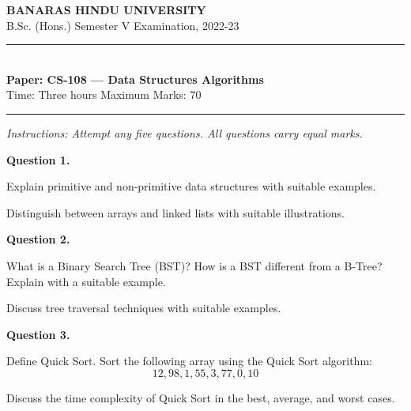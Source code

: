 \documentclass[11pt,a4paper]{article}
\begin{document}
\begin{center}
  {\large\bfseries BANARAS HINDU UNIVERSITY}\\[2pt]
  {\normalsize B.Sc. (Hons.) Semester V Examination, 2022-23}\\[6pt]
  \rule{0.8\linewidth}{0.5pt}\\[6pt]
  {\large\bfseries Paper: CS-108 --- Data Structures Algorithms}\\[4pt]
  {\normalsize Time: Three hours \hfill Maximum Marks: 70}
\end{center}

\rule{\linewidth}{0.4pt}

\smallskip



\noindent   \textit{Instructions: Attempt any five questions. All questions carry equal marks.}

\bigskip

\medskip


\noindent   \textbf{Question 1.}

\begin{parts}
  \item Explain primitive and non-primitive data structures with suitable examples.
  \item Distinguish between arrays and linked lists with suitable illustrations.
\end{parts}

\medskip


\noindent   \textbf{Question 2.}

\begin{parts}
  \item What is a Binary Search Tree (BST)? How is a BST different from a B-Tree? Explain with a suitable example.
  \item Discuss tree traversal techniques with suitable examples.
\end{parts}

\medskip


\noindent   \textbf{Question 3.}

\begin{parts}
  \item Define Quick Sort. Sort the following array using the Quick Sort algorithm:
  \[ 12, 98, 1, 55, 3, 77, 0, 10 \]
  \item Discuss the time complexity of Quick Sort in the best, average, and worst cases.
\end{parts}

\medskip
\end{document}
